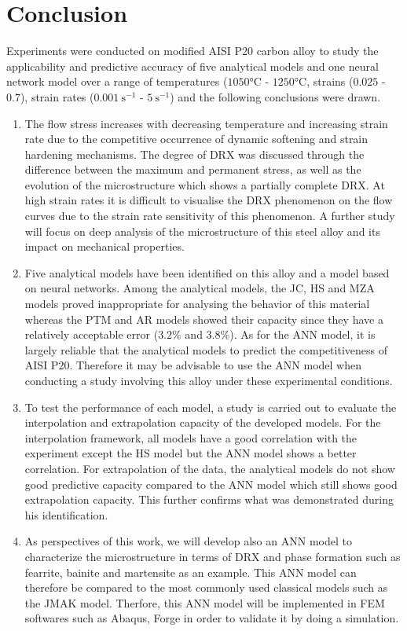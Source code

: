 \documentclass[twoside,english,1p,final,sort&compress]{elsarticle}
\theoremstyle{plain}
\begin{document}
\section{Conclusion \label{sec:Conclusion}}
Experiments were conducted on modified AISI P20 carbon alloy to study the applicability and predictive accuracy of five analytical models and one neural network model over a range of temperatures ($1050$°C - $1250$°C, strains ($0.025$ - $0.7$), strain rates ($0.001\ \text{s}^{-1}$ - $5\ \text{s}^{-1}$) and the following conclusions were drawn.
\begin{enumerate}
\item The flow stress increases with decreasing temperature and increasing strain rate due to the competitive occurrence of dynamic softening and strain hardening mechanisms.  The degree of DRX was discussed through the difference between the maximum and permanent stress, as well as the evolution of the microstructure which shows a partially complete DRX. At high strain rates it is difficult to visualise the DRX phenomenon on the flow curves due to the strain rate sensitivity of this phenomenon. A further study will focus on deep analysis of the microstructure of this steel alloy and its impact on mechanical properties.
\item Five analytical models have been identified on this alloy and a model based on neural networks. Among the analytical models, the JC, HS and MZA models proved inappropriate for analysing the behavior of this material whereas the PTM and AR models showed their capacity since they have a relatively acceptable error ($ 3.2 \% $ and $ 3.8 \%$). As for the ANN model, it is largely reliable that the analytical models to predict the competitiveness of AISI P20. Therefore it may be advisable to use the ANN model when conducting a study involving this alloy under these experimental conditions.
\item To test the performance of each model, a study is carried out to evaluate the interpolation and extrapolation capacity of the developed models. For the interpolation framework, all models have a good correlation with the experiment except the HS model but the ANN model shows a better correlation.  For extrapolation of the data, the analytical models do not show good predictive capacity compared to the ANN model which still shows good extrapolation capacity. This further confirms what was demonstrated during his identification.
\item As perspectives of this work, we will develop also an ANN model to characterize the microstructure in terms of DRX and phase formation such as fearrite, bainite and martensite as an example. This ANN model can therefore be compared to the most commonly used classical models such as the JMAK model. Therfore, this ANN model  will be implemented in FEM softwares such as Abaqus, Forge in order to validate it by doing a simulation.
\end{enumerate}


\end{document}
